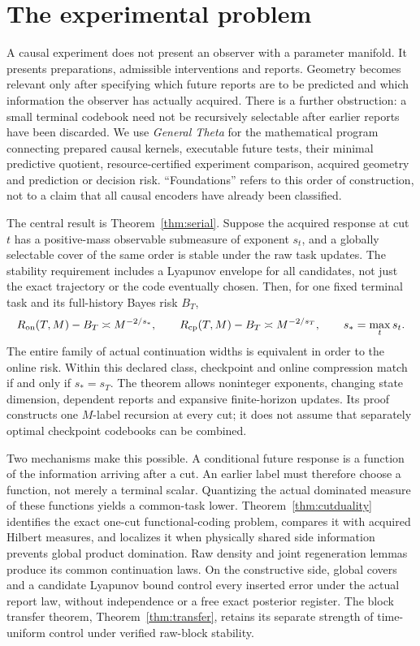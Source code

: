 \section{The experimental problem}\label{sec:problem}
A causal experiment does not present an observer with a parameter manifold. It presents preparations, admissible interventions and reports. Geometry becomes relevant only after specifying which future reports are to be predicted and which information the observer has actually acquired. There is a further obstruction: a small terminal codebook need not be recursively selectable after earlier reports have been discarded. We use \emph{General Theta} for the mathematical program connecting prepared causal kernels, executable future tests, their minimal predictive quotient, resource-certified experiment comparison, acquired geometry and prediction or decision risk. ``Foundations'' refers to this order of construction, not to a claim that all causal encoders have already been classified.

The central result is Theorem~\ref{thm:serial}. Suppose the acquired response at cut $t$ has a positive-mass observable submeasure of exponent $s_t$, and a globally selectable cover of the same order is stable under the raw task updates. The stability requirement includes a Lyapunov envelope for all candidates, not just the exact trajectory or the code eventually chosen. Then, for one fixed terminal task and its full-history Bayes risk $B_T$,
\[
 R_{\mathrm{on}}(T,M)-B_T\asymp M^{-2/s_*},\qquad
 R_{\mathrm{cp}}(T,M)-B_T\asymp M^{-2/s_T},\qquad s_*=\max_t s_t.
\]
The entire family of actual continuation widths is equivalent in order to the online risk. Within this declared class, checkpoint and online compression match if and only if $s_*=s_T$. The theorem allows noninteger exponents, changing state dimension, dependent reports and expansive finite-horizon updates. Its proof constructs one $M$-label recursion at every cut; it does not assume that separately optimal checkpoint codebooks can be combined.

Two mechanisms make this possible. A conditional future response is a function of the information arriving after a cut. An earlier label must therefore choose a function, not merely a terminal scalar. Quantizing the actual dominated measure of these functions yields a common-task lower. Theorem~\ref{thm:cutduality} identifies the exact one-cut functional-coding problem, compares it with acquired Hilbert measures, and localizes it when physically shared side information prevents global product domination. Raw density and joint regeneration lemmas produce its common continuation laws. On the constructive side, global covers and a candidate Lyapunov bound control every inserted error under the actual report law, without independence or a free exact posterior register. The block transfer theorem, Theorem~\ref{thm:transfer}, retains its separate strength of time-uniform control under verified raw-block stability.

